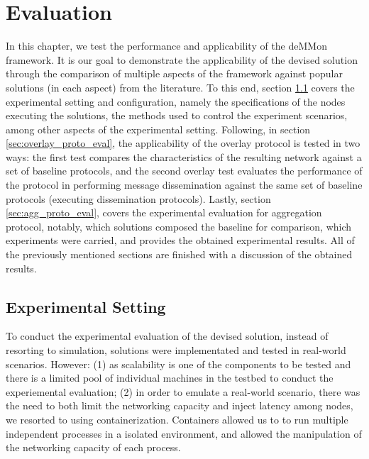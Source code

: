 

\chapter{Evaluation}
\label{cha:evaluation}


In this chapter, we test the performance and applicability of the deMMon framework. It is our goal to demonstrate the applicability of the devised solution through the comparison of multiple aspects of the framework against popular solutions (in each aspect) from the literature. To this end, section \ref{sec:exp_setting_conf} covers the experimental setting and configuration, namely the specifications of the nodes executing the solutions, the methods used to control the experiment scenarios, among other aspects of the experimental setting. Following, in section \ref{sec:overlay_proto_eval}, the applicability of the overlay protocol is tested in two ways: the first test compares the characteristics of the resulting network against a set of baseline protocols, and the second overlay test evaluates the performance of the protocol in performing message dissemination against the same set of baseline protocols (executing dissemination protocols). Lastly, section \ref{sec:agg_proto_eval}, covers the experimental evaluation for aggregation protocol, notably, which solutions composed the baseline for comparison, which experiments were carried, and provides the obtained experimental results. All of the previously mentioned sections are finished with a discussion of the obtained results.

\section{Experimental Setting} \label{sec:exp_setting_conf}

To conduct the experimental evaluation of the devised solution, instead of resorting to simulation, solutions were implementated and tested in real-world scenarios. However: (1) as scalability is one of the components to be tested and there is a limited pool of individual machines in the testbed to conduct the experiemental evaluation; (2) in order to emulate a real-world scenario, there was the need to both limit the networking capacity and inject latency among nodes, we resorted to using containerization. Containers allowed us to to run multiple independent processes in a isolated environment, and allowed the manipulation of the networking capacity of each process. 

